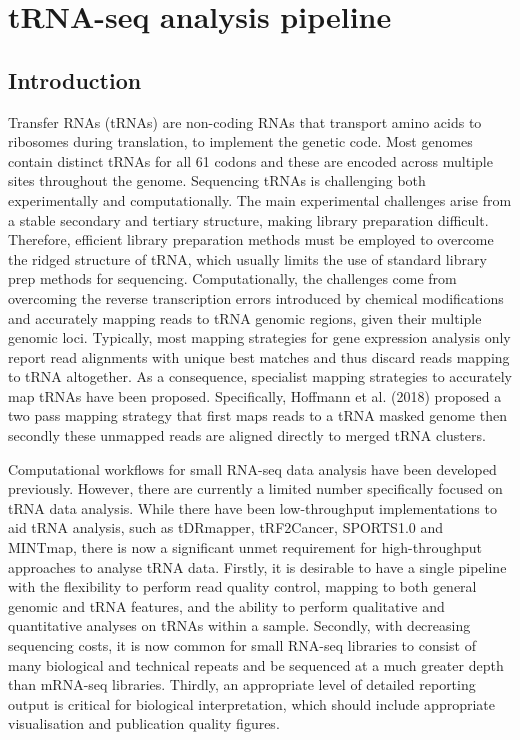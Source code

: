 \section{tRNA-seq analysis pipeline}\label{sec:trna_methods}

\subsection{Introduction}
Transfer RNAs (tRNAs) are non-coding RNAs that transport amino acids to ribosomes during translation, to implement the genetic code.
Most genomes contain distinct tRNAs for all 61 codons and these are encoded across multiple sites throughout the genome.
Sequencing tRNAs is challenging both experimentally and computationally.
The main experimental challenges arise from a stable secondary and tertiary structure, making library preparation difficult\cite{kim1973three}.
Therefore, efficient library preparation methods must be employed to overcome the ridged structure of tRNA, which usually limits the use of standard library prep methods for sequencing\cite{shigematsu2017yamat}.
Computationally, the challenges come from overcoming the reverse transcription errors introduced by chemical modifications and accurately mapping reads to tRNA genomic regions, given their multiple genomic loci\cite{hoffmann2018accurate}.
Typically, most mapping strategies for gene expression analysis only report read alignments with unique best matches and thus discard reads mapping to tRNA altogether.
As a consequence, specialist mapping strategies to accurately map tRNAs have been proposed\cite{selitsky2015tdrmapper, loher2017mintmap, gebert2017unitas}.
Specifically, Hoffmann et al. (2018) proposed a two pass mapping strategy that first maps reads to a tRNA masked genome then secondly these unmapped reads are aligned directly to merged tRNA clusters\cite{hoffmann2018accurate}.

Computational workflows for small RNA-seq data analysis have been developed previously\cite{wu2017srnanalyzer}.
However, there are currently a limited number specifically focused on tRNA data analysis.
While there have been low-throughput implementations to aid tRNA analysis, such as tDRmapper\cite{selitsky2015tdrmapper}, tRF2Cancer\cite{zheng2016trf2cancer}, SPORTS1.0\cite{shi2018sports1} and MINTmap\cite{loher2017mintmap}, there is now a significant unmet requirement for high-throughput approaches to analyse tRNA data.
Firstly, it is desirable to have a single pipeline with the flexibility to perform read quality control, mapping to both general genomic and tRNA features, and the ability to perform qualitative and quantitative analyses on tRNAs within a sample.
Secondly, with decreasing sequencing costs, it is now common for small RNA-seq libraries to consist of many biological and technical repeats and be sequenced at a much greater depth than mRNA-seq libraries.
Thirdly, an appropriate level of detailed reporting output is critical for biological interpretation, which should include appropriate visualisation and publication quality figures.

